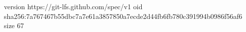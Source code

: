 version https://git-lfs.github.com/spec/v1
oid sha256:7a767467b55dbc7a7e61a3857850a7ecde2d44fb6fb780c391994b0986f56af6
size 67
